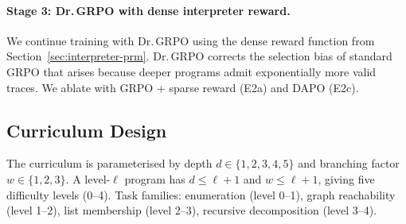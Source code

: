 \paragraph{Stage 3: Dr.\,GRPO with dense interpreter reward.}
We continue training with Dr.\,GRPO using the dense reward function from
Section~\ref{sec:interpreter-prm}.
Dr.\,GRPO corrects the selection bias of standard GRPO that arises because
deeper \gore{} programs admit exponentially more valid traces.
We ablate with GRPO + sparse reward (E2a) and DAPO (E2c).


\subsection{Curriculum Design}
\label{sec:curriculum}

The curriculum is parameterised by depth $d \in \{1,2,3,4,5\}$ and branching
factor $w \in \{1,2,3\}$.
A level-$\ell$ program has $d \leq \ell + 1$ and $w \leq \ell + 1$, giving
five difficulty levels (0--4).
Task families: enumeration (level 0--1), graph reachability (level 1--2), list
membership (level 2--3), recursive decomposition (level 3--4).

